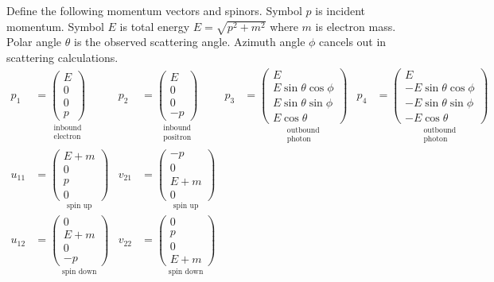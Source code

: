 \documentclass[12pt]{article}
\begin{document}
Define the following momentum vectors and spinors.
Symbol $p$ is incident momentum.
Symbol $E$ is total energy $E=\sqrt{p^2+m^2}$ where $m$ is electron mass.
Polar angle $\theta$ is the observed scattering angle.
Azimuth angle $\phi$ cancels out in scattering calculations.
\begin{align*}
p_1&=
\underset{\substack{\text{inbound}\\\text{electron}}}
{
\begin{pmatrix}E\\0\\0\\p\end{pmatrix}
}
&
p_2&=
\underset{\substack{\text{inbound}\\\text{positron}}}
{
\begin{pmatrix}E\\0\\0\\-p\end{pmatrix}
}
&
p_3&=
\underset{\substack{\text{outbound}\\\text{photon}}}
{
\begin{pmatrix}E\\ E\sin\theta\cos\phi\\ E\sin\theta\sin\phi\\ E\cos\theta\end{pmatrix}
}
&
p_4&=
\underset{\substack{\text{outbound}\\\text{photon}}}
{
\begin{pmatrix}E\\ -E\sin\theta\cos\phi\\ -E\sin\theta\sin\phi\\ -E\cos\theta\end{pmatrix}
}
\\[1ex]
u_{11}&=
\underset{\text{spin up}}
{
\begin{pmatrix}E+m\\0\\p\\0\end{pmatrix}
}
&
v_{21}&=
\underset{\text{spin up}}
{
\begin{pmatrix}-p\\0\\E+m\\0\end{pmatrix}
}
\\[1ex]
u_{12}&=
\underset{\text{spin down}}
{
\begin{pmatrix}0\\E+m\\0\\-p\end{pmatrix}
}
&
v_{22}&=
\underset{\text{spin down}}
{
\begin{pmatrix}0\\p\\0\\E+m\end{pmatrix}
}
\end{align*}
\end{document}
